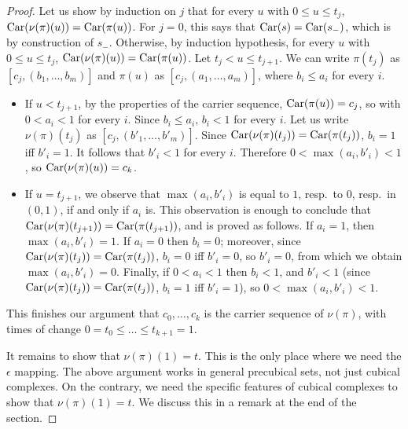 \begin{proof}
  Let us show by induction on $j$ that for every $u$ with $0 \leq
  u\leq t_j$, $\text{Car}(\nu(\pi)(u)) = \text{Car}(\pi(u))$. For $j
  = 0$, this says that $\text{Car}(s) = \text{Car}(s_-)$, which is
  by construction of $s_-$.  Otherwise, by induction hypothesis, for
  every $u$ with $0 \leq u\leq t_j$, $\text{Car}(\nu(\pi)(u)) =
  \text{Car}(\pi(u))$. Let $t_j < u \leq t_{j+1}$.  We can write
  $\pi(t_j)$ as $[c_j,(b_1,\ldots,b_m)]$ and $\pi (u)$ as
  $[c_j,(a_1,\ldots,a_m)]$, where $b_i \leq a_i$ for every $i$.
  \begin{itemize}
  \item If $u < t_{j+1}$, by the properties of the carrier sequence,
    $\text{Car}(\pi(u)) = c_j$, so with $0 < a_i < 1$ for every $i$.
    Since $b_i \leq a_i$, $b_i < 1$ for every $i$.  Let us write
    $\nu(\pi)(t_j)$ as $[c_j,(b'_1,\ldots,b'_m)]$.  Since
    $\text{Car}(\nu(\pi)(t_j)) = \text{Car}(\pi(t_j))$, $b_i = 1$
    iff $b'_i = 1$.  It follows that $b'_i < 1$ for every $i$.
    Therefore $0 < \max(a_i,b'_i) < 1$, so $\text{Car}(\nu(\pi)(u)) =
    c_k$.
  \item If $u = t_{j+1}$, we observe that $\max (a_i, b'_i)$ is equal
    to $1$, resp.\ to $0$, resp.\ in $(0, 1)$, if and only if $a_i$
    is.  This observation is enough to conclude that
    $\text{Car}(\nu(\pi)(t_{j+1})) = \text{Car}(\pi(t_{j+1}))$, and
    is proved as follows.  If $a_i = 1$, then $\max(a_i, \allowbreak
    b'_i) = 1$. If $a_i = 0$ then $b_i = 0$; moreover, since
    $\text{Car}(\nu(\pi)(t_j)) = \text{Car}(\pi(t_j))$, $b_i = 0$
    iff $b'_i = 0$, so $b'_i = 0$, from which we obtain
    $\max(a_i,b'_i) = 0$.  Finally, if $0 < a_i < 1$ then $b_i < 1$,
    and $b'_i < 1$ (since $\text{Car}(\nu(\pi)(t_j)) =
    \text{Car}(\pi(t_j))$, $b_i = 1$ iff $b'_i = 1$), so $0 <
    \max(a_i,b'_i) < 1$.
  \end{itemize}
  This finishes our argument that $c_0,\ldots,c_k$ is the carrier
  sequence of $\nu(\pi)$, with times of change $0=t_0\leq \ldots \leq
  t_{k+1}=1$.
  
  It remains to show that $\nu(\pi)(1) = t$.  This is the only place
  where we need the $\epsilon$ mapping.  The above argument works in
  general precubical sets, not just cubical complexes.  On the
  contrary, we need the specific features of cubical complexes to show
  that $\nu (\pi) (1)=t$.  We discuss this in a remark at the end of
  the section.


\end{proof}
